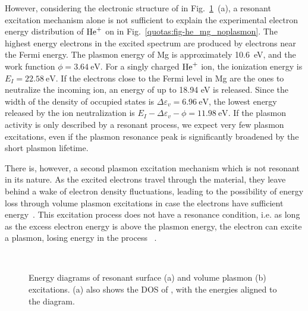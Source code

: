 \begin{refsection}
However, considering the electronic structure of  in Fig.~\ref{quotas:fig-plasmons}~(a), a resonant 
excitation mechanism alone is not sufficient to explain the experimental 
electron energy distribution of $\ce{He^+}$ on  in 
Fig.~\ref{quotas:fig-he_mg_noplasmon}. The highest energy electrons in the 
excited spectrum are produced by electrons near the Fermi energy. The plasmon 
energy of Mg is approximately 10.6~\si{\electronvolt}, and the work function 
$\phi = 3.64~\si{\electronvolt}$. For a singly charged $\ce{He^+}$ 
ion, the ionization energy is $E_I = 22.58~\si{\electronvolt}$. If the electrons close 
to the Fermi level in Mg are the ones to neutralize the incoming ion, an 
energy of up to 18.94 eV is released. Since the width of the density of 
occupied states is $\Delta \varepsilon_{v} = 6.96~\si{\electronvolt}$, the 
lowest energy released by the ion neutralization is $E_I - \Delta\varepsilon_{v} - \phi = 11.98~\si{\electronvolt}$. 
If the plasmon activity is only described by a resonant 
process, we expect very few plasmon excitations, even if the plasmon 
resonance peak is significantly broadened by the short plasmon lifetime.

There is, however, a second plasmon excitation mechanism which is not 
resonant in its nature. As the excited electrons travel through the material, 
they leave behind a wake of electron density fluctuations, leading to the 
possibility of energy loss through volume plasmon excitations in case the 
electrons have sufficient energy~\cite{Ritchie1957}. This excitation process does not have a 
resonance condition, i.e. as long as the excess electron energy is above the 
plasmon energy, the electron can excite a plasmon, losing energy in the process 
~\cite{Baragiola2001}.

\begin{figure}[ht] 
    \centering 
    \captionsetup{width=0.9\textwidth}
    \begin{subfigure}[t]{0.6\textwidth} 
        \centering 
        
         
        \caption{} 
    \end{subfigure}%
    ~  
    \begin{subfigure}[t]{0.4\textwidth} 
        \centering 
        
         
        \caption{} 
    \end{subfigure} 
\caption{Energy diagrams of resonant surface (a) and volume plasmon (b) 
excitations. (a) also shows the DOS of , with the energies 
aligned to the diagram.} 
\label{quotas:fig-plasmons} 
\end{figure} 
 

\end{refsection}
